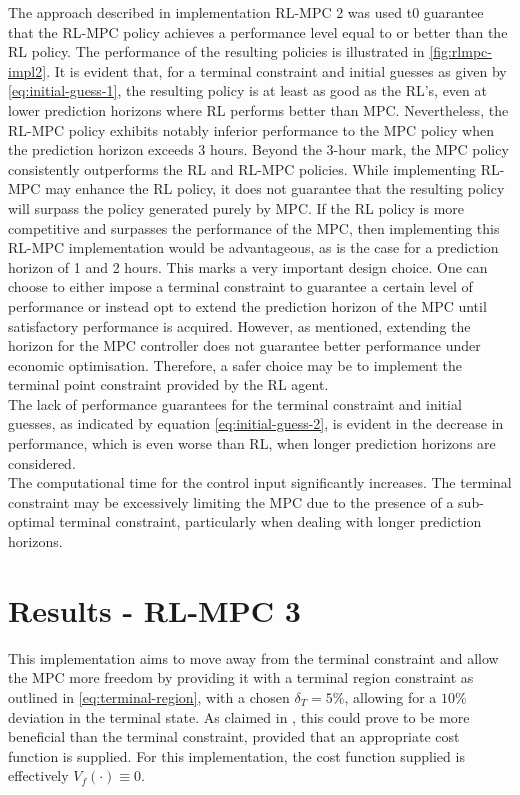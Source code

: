 The approach described in implementation RL-MPC 2 was used t0 guarantee that the RL-MPC policy achieves a performance level equal to or better than the RL policy. The performance of the resulting policies is illustrated in \autoref{fig:rlmpc-impl2}. It is evident that, for a terminal constraint and initial guesses as given by \autoref{eq:initial-guess-1}, the resulting policy is at least as good as the RL's, even at lower prediction horizons where RL performs better than MPC. Nevertheless, the RL-MPC policy exhibits notably inferior performance to the MPC policy when the prediction horizon exceeds 3 hours. Beyond the 3-hour mark, the MPC policy consistently outperforms the RL and RL-MPC policies.  While implementing RL-MPC may enhance the RL policy, it does not guarantee that the resulting policy will surpass the policy generated purely by MPC. If the RL policy is more competitive and surpasses the performance of the MPC, then implementing this RL-MPC implementation would be advantageous, as is the case for a prediction horizon of 1 and 2 hours. This marks a very important design choice. One can choose to either impose a terminal constraint to guarantee a certain level of performance or instead opt to extend the prediction horizon of the MPC until satisfactory performance is acquired. However, as mentioned, extending the horizon for the MPC controller does not guarantee better performance under economic optimisation. Therefore, a safer choice may be to implement the terminal point constraint provided by the RL agent.
\\
The lack of performance guarantees for the terminal constraint and initial guesses, as indicated by equation \autoref{eq:initial-guess-2}, is evident in the decrease in performance, which is even worse than RL, when longer prediction horizons are considered.\\
The computational time for the control input significantly increases. The terminal constraint may be excessively limiting the MPC due to the presence of a sub-optimal terminal constraint, particularly when dealing with longer prediction horizons.

\section{Results - RL-MPC 3}
This implementation aims to move away from the terminal constraint and allow the MPC more freedom by providing it with a terminal region constraint as outlined in \autoref{eq:terminal-region}, with a chosen $\delta_T = 5\%$, allowing for a $10\%$ deviation in the terminal state. As claimed in \cite{amritEconomicOptimizationUsing2011}, this could prove to be more beneficial than the terminal constraint, provided that an appropriate cost function is supplied. For this implementation, the cost function supplied is effectively $V_f(\cdot) \equiv 0$. 


